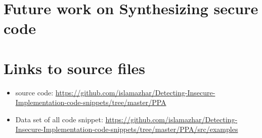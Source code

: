 \section{Future work on Synthesizing secure code}
\section{Links to source files}
\begin{itemize}
\item source code: \url{https://github.com/islamazhar/Detecting-Insecure-Implementation-code-snippets/tree/master/PPA}
\item Data set of all code snippet: \url{https://github.com/islamazhar/Detecting-Insecure-Implementation-code-snippets/tree/master/PPA/src/examples}
\end{itemize}
